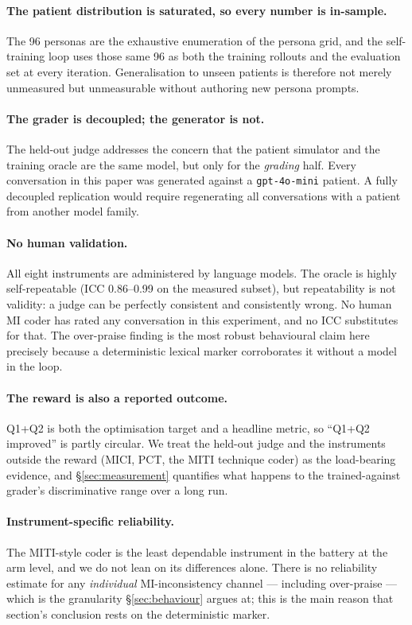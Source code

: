 \paragraph{The patient distribution is saturated, so every number is in-sample.}
The 96 personas are the exhaustive enumeration of the persona grid, and the self-training loop uses
those same 96 as both the training rollouts and the evaluation set at every iteration.
Generalisation to unseen patients is therefore not merely unmeasured but unmeasurable without
authoring new persona prompts.

\paragraph{The grader is decoupled; the generator is not.}
The held-out judge addresses the concern that the patient simulator and the training oracle are the
same model, but only for the \emph{grading} half. Every conversation in this paper was generated
against a \texttt{gpt-4o-mini} patient. A fully decoupled replication would require regenerating
all conversations with a patient from another model family.

\paragraph{No human validation.}
All eight instruments are administered by language models. The oracle is highly self-repeatable
(ICC 0.86--0.99 on the measured subset), but repeatability is not validity: a judge can be
perfectly consistent and consistently wrong. No human MI coder has rated any conversation in this
experiment, and no ICC substitutes for that. The over-praise finding is the most robust behavioural
claim here precisely because a deterministic lexical marker corroborates it without a model in the
loop.

\paragraph{The reward is also a reported outcome.}
Q1+Q2 is both the optimisation target and a headline metric, so ``Q1+Q2 improved'' is partly
circular. We treat the held-out judge and the instruments outside the reward (MICI, PCT, the MITI
technique coder) as the load-bearing evidence, and \S\ref{sec:measurement} quantifies what happens
to the trained-against grader's discriminative range over a long run.

\paragraph{Instrument-specific reliability.}
The MITI-style coder is the least dependable instrument in the battery at the arm level, and we do
not lean on its differences alone. There is no reliability estimate for any \emph{individual}
MI-inconsistency channel --- including over-praise --- which is the granularity
\S\ref{sec:behaviour} argues at; this is the main reason that section's conclusion rests on the
deterministic marker.

